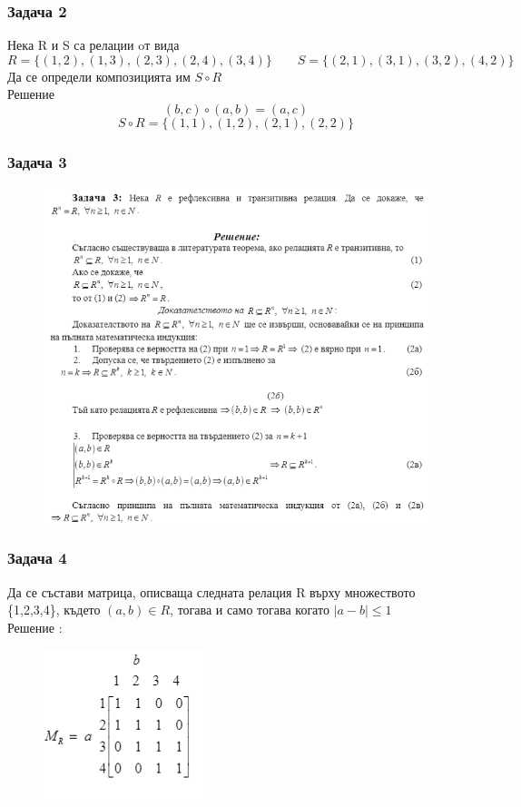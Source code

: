 \documentclass[fleqn, 12pt]{article}
\theoremstyle{definition}
\begin{document}
\subsubsection*{Задача 2}
Нека R и S са релации oт вида
$$R = \{(1, 2), (1, 3), (2, 3), (2, 4), (3, 4) \} \qquad S = \{(2, 1), (3, 1), (3, 2), (4, 2)\}$$
Да се определи композицията им $S \circ R$ \\
Решение \\
$$(b,c) \circ (a,b) = (a,c) $$
$$S \circ R = \{ (1, 1), (1,2), (2, 1), (2, 2) \}$$

\newpage
\subsubsection*{Задача 3}
\begin{figure} [htp!]
\includegraphics[width=\linewidth]{Pics/Discrete math/ex6/ex6-task3.png}
\end{figure}

\newpage
\subsubsection*{Задача 4}
Да се състави матрица, описваща следната релация R върху множеството \{1,2,3,4\}, където $(a,b) \in R $, тогава и само тогава когато $\vert a - b \vert \leq 1$ \\
Решение : \\
\begin{figure} [htp!]
\includegraphics{Pics/Discrete math/ex6/ex6-task4.png}
\end{figure}
\end{document}
